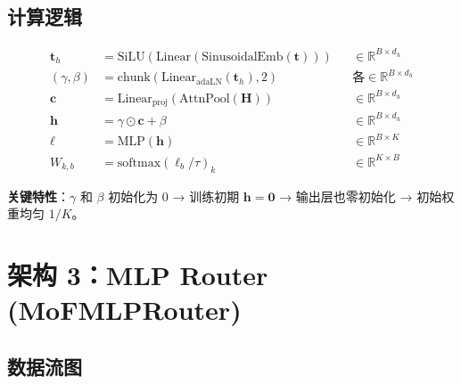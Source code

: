\documentclass[11pt,a4paper]{article}
\newcommand{\softmax}{\mathrm{softmax}}
\newcommand{\R}{\mathbb{R}}
\begin{document}
\subsection{计算逻辑}

\begin{align}
\mathbf{t}_h &= \text{SiLU}(\text{Linear}(\text{SinusoidalEmb}(\mathbf{t}))) && \in \R^{B \times d_h} \\
(\gamma, \beta) &= \text{chunk}(\text{Linear}_{\text{adaLN}}(\mathbf{t}_h), 2) && \text{各} \in \R^{B \times d_h} \\[0.5em]
\mathbf{c} &= \text{Linear}_{\text{proj}}(\text{AttnPool}(\mathbf{H})) && \in \R^{B \times d_h} \\[0.5em]
\mathbf{h} &= \gamma \odot \mathbf{c} + \beta && \in \R^{B \times d_h} \\
\bm{\ell} &= \text{MLP}(\mathbf{h}) && \in \R^{B \times K} \\
W_{k,b} &= \softmax(\bm{\ell}_b / \tau)_k && \in \R^{K \times B}
\end{align}

\textbf{关键特性}：$\gamma$ 和 $\beta$ 初始化为 0 → 训练初期 $\mathbf{h} = \mathbf{0}$ → 输出层也零初始化 → 初始权重均匀 $1/K$。

\section{架构 3：MLP Router (MoFMLPRouter)}

\subsection{数据流图}
\end{document}
